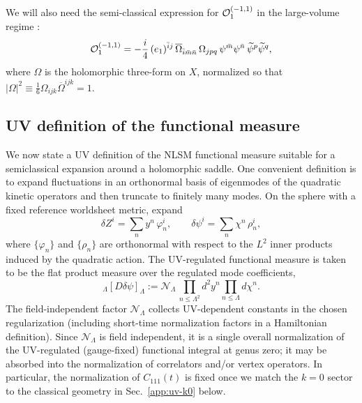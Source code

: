 \documentclass[12pt]{article}
\newcommand{\wt}{\widetilde}
\begin{document}
We will also need the semi-classical expression for ${\cal O}_1^{(-1,1)}$ in the
large-volume regime \cite[Eq.~(19.181)]{Yin:FoundationsStringTheory}:
\begin{equation}
  {\cal O}_1^{(-1,1)}
  =
  -\frac{i}{4}\,(e_1)^{\bar i j}\,
  \overline{\Omega}_{\bar i\bar m\bar n}\,\Omega_{jpq}\,
  \psi^{\bar m}\psi^{\bar n}\,\wt\psi^{p}\wt\psi^{q},
  \label{eq:uv-o1-minusplus}
\end{equation}
where $\Omega$ is the holomorphic three-form on $X$, normalized so that
$|\Omega|^2\equiv \frac{1}{6}\Omega_{ijk}\overline{\Omega}^{ijk}=1$.

\subsection{UV definition of the functional measure}
We now state a UV definition of the NLSM functional measure suitable for a
semiclassical expansion around a holomorphic saddle. One convenient definition
is to expand fluctuations in an orthonormal basis of eigenmodes of the
quadratic kinetic operators and then truncate to finitely many modes. On the
sphere with a fixed reference worldsheet metric, expand
\begin{equation}
  \delta Z^i = \sum_{n} y^n\,\varphi_n^i,
  \qquad
  \delta\psi^i = \sum_{n} \chi^n\,\rho_n^i,
  \label{eq:uv-mode-expansion}
\end{equation}
where $\{\varphi_n\}$ and $\{\rho_n\}$ are orthonormal with respect to the $L^2$
inner products induced by the quadratic action. The UV-regulated functional
measure is taken to be the flat product measure over the regulated mode
coefficients,
\begin{equation}
  [D\delta Z]_\Lambda[D\delta\psi]_\Lambda
  :=
  \mathcal{N}_\Lambda\,
  \prod_{n\le \Lambda^2} d^2 y^n \prod_{n\le \Lambda} d\chi^n.
  \label{eq:uv-measure-def}
\end{equation}
The field-independent factor $\mathcal{N}_\Lambda$ collects UV-dependent
constants in the chosen regularization (including short-time normalization
factors in a Hamiltonian definition). Since $\mathcal{N}_\Lambda$ is field
independent, it is a single overall normalization of the UV-regulated
(gauge-fixed) functional integral at genus zero; it may be absorbed into the
normalization of correlators and/or vertex operators. In particular, the
normalization of $C_{111}(t)$ is fixed once we match the $k=0$ sector to the
classical geometry in Sec.~\ref{app:uv-k0} below.
\end{document}
